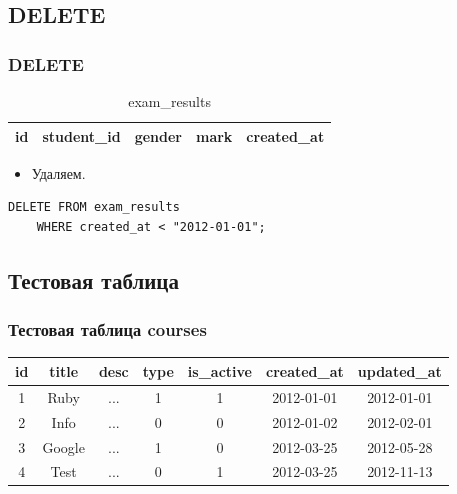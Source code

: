 \documentclass[compress,red]{beamer}
\begin{document}
\subsection{DELETE}
\begin{frame}[fragile]
  \frametitle{DELETE}
  \begin{table}
    \begin{tabular}{|c|c|c|c|c|}
      \hline
      id & student\_id & gender & mark & created\_at\\
      \hline
    \end{tabular}
    \caption{exam\_results}
  \end{table}
  \begin{itemize}
    \item Удаляем.
  \end{itemize}
  \scriptsize{
  \begin{lstlisting}[label=sql11,caption=DELETE]
    DELETE FROM exam_results
    WHERE created_at < "2012-01-01";
  \end{lstlisting}
  }
\end{frame}

\subsection{Тестовая таблица}
\begin{frame}[fragile]
  \frametitle{Тестовая таблица courses}
  \begin{tabular}{|c|c|c|c|c|c|c|}
  \hline
  id & title & desc & type & is\_active & created\_at & updated\_at\\
  \hline
  1 & Ruby & ... & 1 & 1 & 2012-01-01 & 2012-01-01\\
  \hline
  2 & Info & ... & 0 & 0 & 2012-01-02 & 2012-02-01\\
  \hline
  3 & Google & ... & 1 & 0 & 2012-03-25 & 2012-05-28\\
  \hline
  4 & Test & ... & 0 & 1 & 2012-03-25 & 2012-11-13\\
  \hline
  \end{tabular}
\end{frame}
\end{document}
